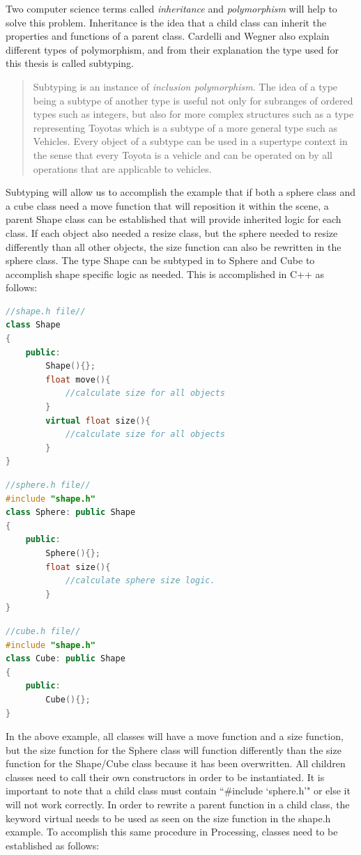Two computer science terms called \textit{inheritance} and \textit{polymorphism} will help to solve this problem.  Inheritance is the idea that a child class can inherit the properties and functions of a parent class.  Cardelli and Wegner also explain different types of polymorphism, and from their explanation the type used for this thesis is called subtyping.
\begin{quote}
Subtyping is an instance of \textit{inclusion polymorphism}. The idea of a type being a subtype of another type is useful not only for subranges of ordered types such as integers, but also for more complex structures
such as a type representing Toyotas which is a subtype of a more general type such as Vehicles. Every object of a subtype can be used in a supertype context in the sense that every Toyota is a vehicle and can be
operated on by all operations that are applicable to vehicles. \cite{cardelli1985understanding}
\end{quote}
Subtyping will allow us to accomplish the example that if both a sphere class and a cube class need a move function that will reposition it within the scene, a parent Shape class can be established that will provide inherited logic for each class.  If each object also needed a resize class, but the sphere needed to resize differently than all other objects, the size function can also be rewritten in the sphere class.  The type Shape can be subtyped in to Sphere and Cube to accomplish shape specific logic as needed.  This is accomplished in C++ as follows:

\singlespacing
\begin{lstlisting}[language=C++, style=mystyle]
//shape.h file//
class Shape
{
    public:
        Shape(){};
        float move(){
            //calculate size for all objects
        }
        virtual float size(){
            //calculate size for all objects
        }
}
\end{lstlisting}
\begin{lstlisting}[language=C++, style=mystyle]
//sphere.h file//
#include "shape.h"
class Sphere: public Shape
{
    public:
        Sphere(){};
        float size(){
            //calculate sphere size logic.
        }
}
\end{lstlisting}
\begin{lstlisting}[language=C++, caption=C++ Inheritance Example, style=mystyle]
//cube.h file//
#include "shape.h"
class Cube: public Shape
{
    public:
        Cube(){};
}
\end{lstlisting}
\doublespacing
In the above example, all classes will have a move function and a size function, but the size function for the Sphere class will function differently than the size function for the Shape/Cube class because it has been overwritten.  All children classes need to call their own constructors in order to be instantiated.  It is important to note that a child class must contain ``\#include `sphere.h'" or else it will not work correctly. In order to rewrite a parent function in a child class, the keyword virtual needs to be used as seen on the size function in the shape.h example.  To accomplish this same procedure in Processing, classes need to be established as follows:

